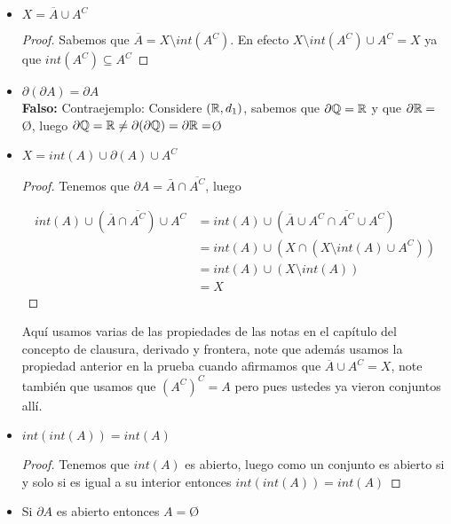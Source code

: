 \begin{itemize}[label={☠}]
\item $X=\overline{A}\cup A^{C}$\\

\begin{proof}
Sabemos que $\overline{A}=X\setminus int(A^C)$. En efecto $X\setminus int(A^C)\cup A^C=X$ ya que $int(A^C)\subseteq A^C$
\end{proof}
 
\item $\partial(\partial A)=\partial A$\\

\textbf{Falso:} Contraejemplo: Considere $(\mathbb{R},d_1)$, sabemos que $\partial \mathbb{Q}=\mathbb{R}$ y que $\partial \mathbb{R}= $\O, luego $\partial \mathbb{Q}=\mathbb{R}\neq\partial(\partial \mathbb{Q})=\partial \mathbb{R}=$\O

\item $X=int(A)\cup \partial(A) \cup A^C$\\

\begin{proof}
Tenemos que $\partial A=\bar{A} \cap \overline{A^C}$, luego

\begin{align*}
int(A)\cup (\overline{A}\cap \overline{A^C}) \cup A^C&=int(A)\cup (\overline{A}\cup A^C\cap \overline{A^C}\cup A^C)\\
&=int(A)\cup (X\cap (X\setminus int(A)\cup A^C))\\
&=int(A)\cup (X\setminus int(A))\\
&=X
\end{align*}
\end{proof}

\begin{note}
Aquí usamos varias de las propiedades de las notas en el capítulo del concepto de clausura, derivado y frontera, note que además usamos la propiedad anterior en la prueba cuando afirmamos que $\overline{A}\cup A^C=X$, note también que usamos que $(A^C)^C=A$ pero pues ustedes ya vieron conjuntos allí.
\end{note}

\item $int(int(A))=int(A)$\\

\begin{proof}
 Tenemos que $int(A)$ es abierto, luego como un conjunto es abierto si y solo si es igual a su interior entonces $int(int(A))=int(A)$
\end{proof}


\item Si $\partial A$ es abierto entonces $A=$\O\\


\end{itemize}
